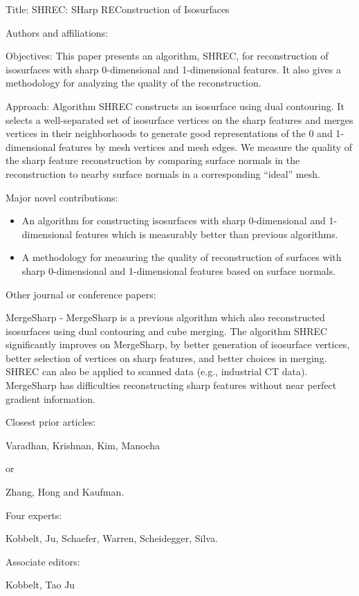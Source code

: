 \documentclass{article}
\begin{document}
Title: SHREC: SHarp REConstruction of Isosurfaces

Authors and affiliations:

Objectives: This paper presents an algorithm, SHREC, for reconstruction 
of isosurfaces with sharp 0-dimensional and 1-dimensional features.
It also gives a methodology for analyzing the quality of the reconstruction.

Approach: Algorithm SHREC constructs an isosurface using dual contouring.
It selects a well-separated set of isosurface vertices on the sharp features
and merges vertices in their neighborhoods to generate good representations
of the 0 and 1-dimensional features by mesh vertices and mesh edges.
We measure the quality of the sharp feature reconstruction
by comparing surface normals in the reconstruction to nearby surface normals 
in a corresponding ``ideal'' mesh.

Major novel contributions:
\begin{itemize}
\item An algorithm for constructing isosurfaces with sharp 0-dimensional 
and 1-dimensional features which is measurably better than previous algorithms.
\item A methodology for measuring the quality of reconstruction of
surfaces with sharp 0-dimensional and 1-dimensional features
based on surface normals.
\end{itemize}

Other journal or conference papers:

MergeSharp - MergeSharp is a previous algorithm which also reconstructed
isosurfaces using dual contouring and cube merging.  The algorithm SHREC
significantly improves on MergeSharp, by better generation
of isosurface vertices, better selection of vertices on sharp features,
and better choices in merging.  SHREC can also be applied to scanned data
(e.g., industrial CT data).
MergeSharp has difficulties reconstructing sharp features
without near perfect gradient information.


Closest prior articles:

Varadhan, Krishnan, Kim, Manocha

or

Zhang, Hong and Kaufman.

Four experts:

Kobbelt, Ju, Schaefer, Warren, Scheidegger, Silva.

Associate editors:

Kobbelt, Tao Ju
\end{document}
